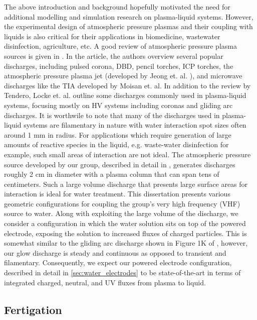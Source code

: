 The above introduction and background hopefully motivated the need for additional modelling and simulation research on plasma-liquid systems. However, the experimental design of atmospheric pressure plasmas and their coupling with liquids is also critical for their applications in biomedicine, wastewater disinfection, agriculture, etc. A good review of atmospheric pressure plasma sources is given in \cite{tendero2006atmospheric}. In the article, the authors overview several popular discharges, including pulsed corona, DBD, pencil torches, ICP torches, the atmospheric pressure plasma jet (developed by Jeong et. al. \cite{park2001discharge}), and microwave discharges like the TIA developed by Moisan et. al. \cite{moisan1994atmospheric} In addition to the review by Tendero, Locke et. al. outline some discharges commonly used in plasma-liquid systems, focusing mostly on HV systems including coronas and gliding arc discharges. \cite{locke2006electrohydraulic} It is worthwile to note that many of the discharges used in plasma-liquid systems are filamentary in nature with water interaction spot sizes often around 1 mm in radius. For applications which require generation of large amounts of reactive species in the liquid, e.g. waste-water disinfection for example, such small areas of interaction are not ideal. The atmospheric pressure source developed by our group, described in detail in \cite{byrns2012vhf}, generates discharges roughly 2 cm in diameter with a plasma column that can span tens of centimeters. Such a large volume discharge that presents large surface areas for interaction is ideal for water treatment. This dissertation presents various geometric configurations for coupling the group's very high frequency (VHF) source to water. Along with exploiting the large volume of the discharge, we consider a configuration in which the water solution sits on top of the powered electrode, exposing the solution to increased fluxes of charged particles. This is somewhat similar to the gliding arc discharge shown in Figure 1K of \cite{locke2006electrohydraulic}, however, our glow discharge is steady and continuous as opposed to transient and filamentary. Consequently, we expect our powered electrode configuration, described in detail in \cref{sec:water_electrodes} to be state-of-the-art in terms of integrated charged, neutral, and UV fluxes from plasma to liquid.

\subsection{Fertigation}

